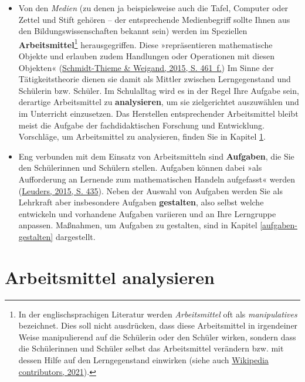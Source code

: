\documentclass[
  ngerman,
]{scrbook}
\theoremstyle{definition}
\theoremstyle{definition}
\theoremstyle{definition}
\theoremstyle{definition}
\theoremstyle{remark}
\begin{document}
\begin{itemize}
\item
  Von den \emph{Medien} (zu denen ja beispielsweise auch die Tafel, Computer oder Zettel und Stift gehören -- der entsprechende Medienbegriff sollte Ihnen aus den Bildungswissenschaften bekannt sein) werden im Speziellen \textbf{Arbeitsmittel}\footnote{In der englischsprachigen Literatur werden \emph{Arbeitsmittel} oft als \emph{manipulatives} bezeichnet. Dies soll nicht ausdrücken, dass diese Arbeitsmittel in irgendeiner Weise manipulierend auf die Schülerin oder den Schüler wirken, sondern dass die Schülerinnen und Schüler selbst das Arbeitsmittel verändern bzw. mit dessen Hilfe auf den Lerngegenstand einwirken (siehe auch \protect\hyperlink{ref-enwiki:1023437370}{Wikipedia contributors, 2021}).} herausgegriffen. Diese »repräsentieren mathematische Objekte und erlauben zudem Handlungen oder Operationen mit diesen Objekten« (\protect\hyperlink{ref-Schmidt-Thieme2015}{Schmidt-Thieme \& Weigand, 2015, S. 461~f.}) Im Sinne der Tätigkeitstheorie dienen sie damit als Mittler zwischen Lerngegenstand und Schülerin bzw. Schüler. Im Schulalltag wird es in der Regel Ihre Aufgabe sein, derartige Arbeitsmittel zu \textbf{analysieren}, um sie zielgerichtet auszuwählen und im Unterricht einzusetzen. Das Herstellen entsprechender Arbeitsmittel bleibt meist die Aufgabe der fachdidaktischen Forschung und Entwicklung. Vorschläge, um Arbeitsmittel zu analysieren, finden Sie in Kapitel \ref{arbeitsmittel-analysieren}.
\item
  Eng verbunden mit dem Einsatz von Arbeitsmitteln sind \textbf{Aufgaben}, die Sie den Schülerinnen und Schülern stellen. Aufgaben können dabei »als Aufforderung an Lernende zum mathematischen Handeln aufgefasst« werden (\protect\hyperlink{ref-Leuders2015}{Leuders, 2015, S. 435}). Neben der Auswahl von Aufgaben werden Sie als Lehrkraft aber insbesondere Aufgaben \textbf{gestalten}, also selbst welche entwickeln und vorhandene Aufgaben variieren und an Ihre Lerngruppe anpassen. Maßnahmen, um Aufgaben zu gestalten, sind in Kapitel \ref{aufgaben-gestalten} dargestellt.
\end{itemize}

\hypertarget{arbeitsmittel-analysieren}{%
\chapter{Arbeitsmittel analysieren}\label{arbeitsmittel-analysieren}}
\end{document}
